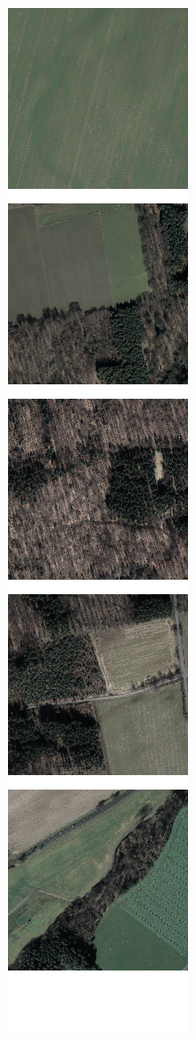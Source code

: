 \begin{figure}
    \centering
    \newcommand{\VegetationImageWidth}{0.13\textwidth}

    \begin{subfigure}{\VegetationImageWidth}
        \includegraphics[width=\textwidth]{images/vegetation/original}

\end{subfigure}
\end{figure}
